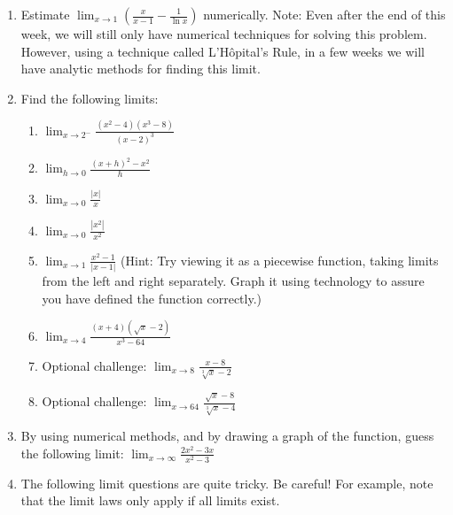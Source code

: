 \documentclass{article}
\begin{document}
\begin{itemize}
\begin{enumerate}
                       \item Estimate $\displaystyle \lim_{x \rightarrow 1} \left(\frac{x}{x-1} - \frac{1}{\ln{x}}\right)$ numerically. Note: Even after the end of this week, we will still only have numerical techniques for solving this problem. However, using a technique called L'H\^{o}pital's Rule, in a few weeks we will have analytic methods for finding this limit.
                        \item Find the following limits:
                        \begin{enumerate}
                            \item   $\displaystyle \lim_{x \rightarrow 2^-} \frac{(x^2-4)(x^3-8)}{(x-2)^3}$
                            \item  $\displaystyle \lim_{h\rightarrow 0} \frac{(x+h)^2-x^2}{h}$
                            \item $\displaystyle \lim_{x\rightarrow 0} \frac{\left|x\right|}{x}$
                            \item $\displaystyle \lim_{x\rightarrow 0} \frac{\left|x^2\right|}{x^2}$
                            \item $\displaystyle \lim_{x \rightarrow 1} \frac{x^2-1}{|x-1|}$ (Hint: Try viewing it as a piecewise function, taking limits from the left and right separately. Graph it using technology to assure you have defined the function correctly.)
                            \item $\displaystyle \lim_{x \rightarrow 4} \frac{(x+4)(\sqrt{x}-2)}{x^3-64}$
                            \item Optional challenge: $\displaystyle \lim_{x \rightarrow 8} \frac{x-8}{\sqrt[3]{x}-2}$
                            \item Optional challenge: $\displaystyle \lim_{x \rightarrow 64} \frac{\sqrt{x}-8}{\sqrt[3]{x}-4}$
                        \end{enumerate}
                        \item By using numerical methods, and by drawing a graph of the function, guess the following limit:
                        $\displaystyle \lim_{x \rightarrow \infty} \frac{2x^2-3x}{x^2-3}$
                        \item The following limit questions are quite tricky. Be careful! For example, note that the limit laws only apply if all limits exist.
    

\end{enumerate}
\end{itemize}
\end{document}
